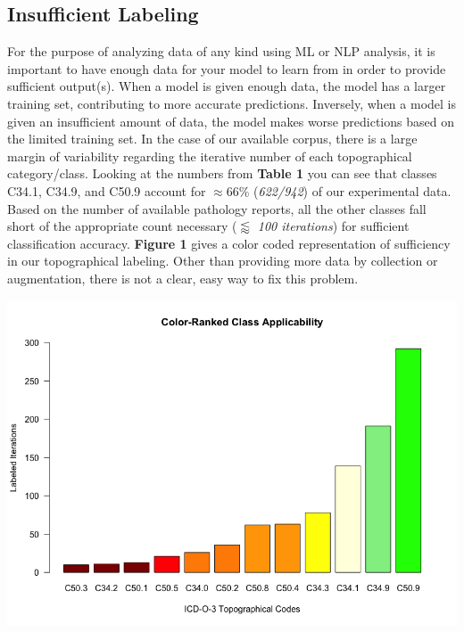 \documentclass[twoside,twocolumn]{article}
\newenvironment{Figure}
  {\par\medskip\noindent\minipage{\linewidth}}
  {\endminipage\par\medskip}
\begin{document}
\subsection{Insufficient Labeling}
For the purpose of analyzing data of any kind using ML or NLP analysis, it is important to have enough data for your model to learn from in order to provide sufficient output(s). When a model is given enough data, the model has a larger training set, contributing to more accurate predictions. Inversely, when a model is given an insufficient amount of data, the model makes worse predictions based on the limited training set. In the case of our available corpus, there is a large margin of variability regarding the iterative number of each topographical category/class. Looking at the numbers from \textbf{Table 1} you can see that classes C34.1, C34.9, and C50.9 account for $\approx$66\% (\textit{622/942}) of our experimental data. Based on the number of available pathology reports, all the other classes fall short of the appropriate count necessary ($\lessapprox$ \textit{100 iterations}) for sufficient classification accuracy. \textbf{Figure 1} gives a color coded representation of sufficiency in our topographical labeling. Other than providing more data by collection or augmentation, there is not a clear, easy way to fix this problem.

\begin{Figure}
 \centering
 \label{fig:bar}
 \includegraphics[width=\linewidth]{Barplot_Final.png}
\end{Figure}
\end{document}
